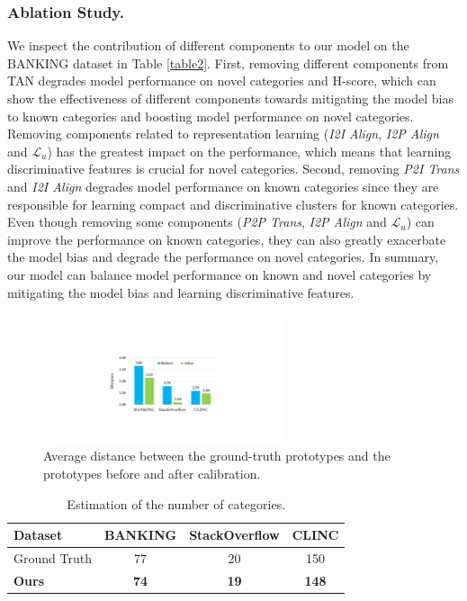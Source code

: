 \documentclass[letterpaper]{article} %
\begin{document}
\subsubsection{Ablation Study. }
We inspect the contribution of different components to our model on the BANKING dataset in Table \ref{table2}. First, removing different components from TAN degrades model performance on novel categories and H-score, which can show the effectiveness of different components towards mitigating the model bias to known categories and boosting model performance on novel categories. Removing components related to representation learning (\textit{I2I Align}, \textit{I2P Align} and $\mathcal{L}_{u}$) has the greatest impact on the performance, which means that learning discriminative features is crucial for novel categories. Second, removing \textit{P2I Trans} and \textit{I2I Align} degrades model performance on known categories since they are responsible for learning compact and discriminative clusters for known categories. Even though removing some components (\textit{P2P Trans}, \textit{I2P Align} and $\mathcal{L}_{u}$) can improve the performance on known categories, they can also greatly exacerbate the model bias and degrade the performance on novel categories. In summary, our model can balance model performance on known and novel categories by mitigating the model bias and learning discriminative features.


\begin{figure}
\centering
\includegraphics[width=7.5cm, height=3.8cm]{calibration.pdf}
\caption{Average distance between the ground-truth prototypes and the prototypes before and after calibration.} 
\label{fig3}
\end{figure}


\begin{table}
\centering
\begin{tabular}{lccc}
\toprule
Dataset & BANKING  & StackOverflow  & CLINC \\
\midrule
Ground Truth       & 77    & 20 & 150\\
\textbf{Ours}               & \textbf{74}    & \textbf{19} & \textbf{148}\\
\bottomrule
\end{tabular}
\caption{Estimation of the number of categories.}
\label{table4}
\end{table}
\end{document}
